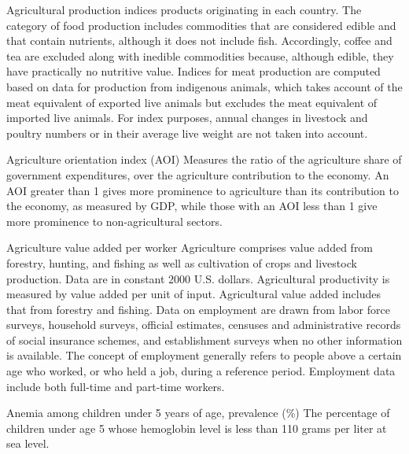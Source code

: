 \begin{MetadataCollection} {}
\begin{metadata}{Agricultural production indices} {}
products originating in each country. The category of food production includes commodities that are considered edible and that contain nutrients, although it does not include fish. Accordingly, coffee and tea are excluded along with inedible commodities because, although edible, they have practically no nutritive value. Indices for meat production are computed based on data for production from indigenous animals, which takes account of the meat equivalent of exported live animals but excludes the meat equivalent of imported live animals. For index purposes, annual changes in livestock and poultry numbers or in their average live weight are not taken into account.
\end{metadata}

\begin{metadata}{Agriculture orientation index (AOI)} {}
Measures the ratio of the agriculture share of government expenditures, over the agriculture contribution to the economy. An AOI greater than 1 gives more prominence to agriculture than its contribution to the economy, as measured by GDP, while those with an AOI less than 1 give more prominence to non-agricultural sectors.
\end{metadata}

\begin{metadata}{Agriculture value added per worker} {}
Agriculture comprises value added from forestry, hunting, and fishing as well as cultivation of crops and livestock production. Data are in constant 2000 U.S. dollars. Agricultural productivity is measured by value added per unit of input. Agricultural value added includes that from forestry and fishing. Data on employment are drawn from labor force surveys, household surveys, official estimates, censuses and administrative records of social insurance schemes, and establishment surveys when no other information is available. The concept of employment generally refers to people above a certain age who worked, or who held a job, during a reference period. Employment data include both full-time and part-time workers.
\end{metadata}

\begin{metadata}{Anemia among children under 5 years of age, prevalence (\%)} {}
The percentage of children under age 5 whose hemoglobin level is less than 110 grams per liter at sea level.
\end{metadata}


\end{MetadataCollection}
